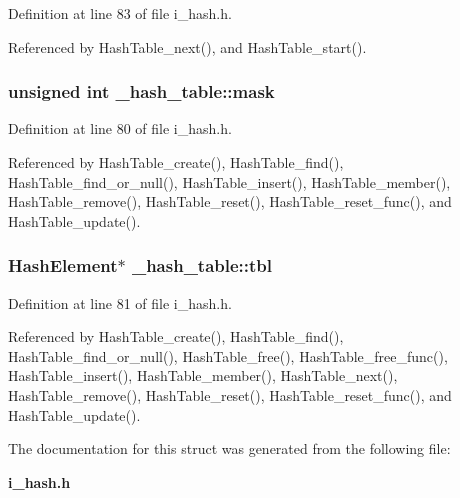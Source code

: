 Definition at line 83 of file i\_\-hash.h.

Referenced by Hash\-Table\_\-next(), and Hash\-Table\_\-start().
\subsubsection{\setlength{\rightskip}{0pt plus 5cm}unsigned int \bf{\_\-hash\_\-table::mask}}\label{struct__hash__table_1468edf806d696345eda79625d0b48aa}




Definition at line 80 of file i\_\-hash.h.

Referenced by Hash\-Table\_\-create(), Hash\-Table\_\-find(), Hash\-Table\_\-find\_\-or\_\-null(), Hash\-Table\_\-insert(), Hash\-Table\_\-member(), Hash\-Table\_\-remove(), Hash\-Table\_\-reset(), Hash\-Table\_\-reset\_\-func(), and Hash\-Table\_\-update().
\subsubsection{\setlength{\rightskip}{0pt plus 5cm}\bf{Hash\-Element}$\ast$ \bf{\_\-hash\_\-table::tbl}}\label{struct__hash__table_3b55b39098f1ebff63a007529132eb2c}




Definition at line 81 of file i\_\-hash.h.

Referenced by Hash\-Table\_\-create(), Hash\-Table\_\-find(), Hash\-Table\_\-find\_\-or\_\-null(), Hash\-Table\_\-free(), Hash\-Table\_\-free\_\-func(), Hash\-Table\_\-insert(), Hash\-Table\_\-member(), Hash\-Table\_\-next(), Hash\-Table\_\-remove(), Hash\-Table\_\-reset(), Hash\-Table\_\-reset\_\-func(), and Hash\-Table\_\-update().

The documentation for this struct was generated from the following file:\begin{CompactItemize}
\item 
\bf{i\_\-hash.h}\end{CompactItemize}
